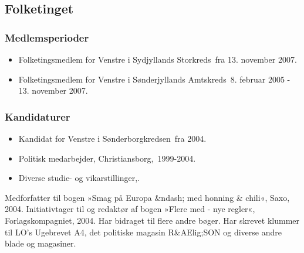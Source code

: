 \documentclass[11pt, a4paper]{awesome-cv}
\begin{document}
\begin{cvletter}
\subsection*{Folketinget}
\subsubsection*{Medlemsperioder}
\begin{itemize}
\item Folketingsmedlem for Venstre i Sydjyllands Storkreds fra 13. november 2007.
\item Folketingsmedlem for Venstre i Sønderjyllands Amtskreds 8. februar 2005 - 13. november 2007.
\end{itemize}
\subsubsection*{Kandidaturer}
\begin{itemize}
\item Kandidat for Venstre i Sønderborgkredsen fra 2004.
\end{itemize}
\begin{itemize}
\item Politisk medarbejder, Christiansborg, 1999-2004.
\item Diverse studie- og vikarstillinger,.
\end{itemize}
Medforfatter til bogen »Smag på Europa &ndash; med honning \& chili«, Saxo, 2004. Initiativtager til og redaktør af bogen »Flere med - nye regler«, Forlagskompagniet, 2004. Har bidraget til flere andre bøger. Har skrevet klummer til LO's Ugebrevet A4, det politiske magasin R&AElig;SON og diverse andre blade og magasiner.

\end{cvletter}
\end{document}
